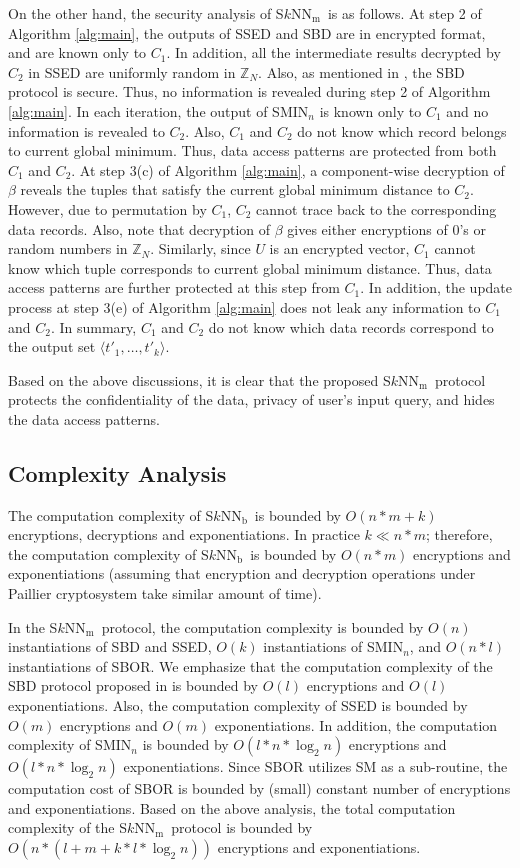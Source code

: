 \documentclass{article}
\newcommand{\sknnb}{S$k$NN$_\textrm{b}$}
\newcommand{\sknnm}{S$k$NN$_\textrm{m}$}
\begin{document}
On the other hand, the security analysis of \sknnm~is as follows. At step 2 of Algorithm \ref{alg:main}, 
the outputs of SSED and SBD are in encrypted format, and are 
known only to $C_1$. In addition, all the intermediate results decrypted  
by $C_2$ in SSED are uniformly random in $\mathbb{Z}_{N}$. Also, 
as mentioned in \cite{bksam-asiaccs13}, the SBD protocol is secure. Thus, 
no information is revealed during step 2 of Algorithm \ref{alg:main}. In each 
iteration, the output of SMIN$_n$ is known only to $C_1$ and no information 
is revealed to $C_2$. Also, $C_1$ and $C_2$ do not know which record belongs 
to current global minimum. Thus, data access patterns are protected 
from both $C_1$ and $C_2$. At step 3(c) of Algorithm \ref{alg:main}, a component-wise decryption 
of $\beta$ reveals the tuples that satisfy the current global minimum 
distance to $C_2$. However, due to permutation by $C_1$, $C_2$ cannot trace back 
to the corresponding data records. Also, note that decryption 
of $\beta$ gives either encryptions of 0's or random numbers in $\mathbb{Z}_N$. 
Similarly, since $U$ is an encrypted 
vector, $C_1$ cannot know which tuple corresponds to current global minimum distance. 
Thus, data access patterns are further protected at this step from $C_1$. In addition, 
the update process at step 3(e) of Algorithm \ref{alg:main} does not leak any information 
to $C_1$ and $C_2$. In summary, $C_1$ and $C_2$ do not know which data records correspond  
to the output set $\langle t'_1, \ldots, t'_k\rangle$.

Based on the above discussions, it is clear that the proposed \sknnm~protocol 
protects the confidentiality of the data, privacy of user's input query, and hides 
the data access patterns.

\subsection{Complexity Analysis}\label{sec:complexity}
The computation complexity of \sknnb~is bounded by $O(n*m+k)$ encryptions, decryptions and 
exponentiations. In practice $k \ll n*m$; therefore, the computation complexity of 
\sknnb~is bounded by $O(n*m)$ encryptions and exponentiations (assuming that encryption and decryption 
operations under Paillier cryptosystem take similar amount of time). 

In the \sknnm~protocol, the computation complexity is bounded by $O(n)$ 
instantiations of SBD and SSED, $O(k)$ instantiations of SMIN$_n$, and $O(n*l)$ instantiations 
of SBOR. We emphasize that the computation complexity of the SBD protocol 
proposed in \cite{bksam-asiaccs13} is bounded by $O(l)$ encryptions and $O(l)$ exponentiations. 
Also, the computation complexity of SSED is bounded by $O(m)$ encryptions and $O(m)$ exponentiations. In 
addition, the computation complexity of SMIN$_n$ is bounded by $O(l\ast n\ast\log_2 n)$ encryptions 
and $O(l\ast n\ast \log_2 n)$ exponentiations. Since SBOR utilizes SM as a sub-routine, 
the computation cost of SBOR is bounded by (small) constant number of encryptions and exponentiations. 
Based on the above analysis, the total computation complexity of the \sknnm~protocol 
is bounded by $O(n\ast (l + m + k\ast l \ast \log_2 n))$ 
encryptions and exponentiations.
 
\end{document}
